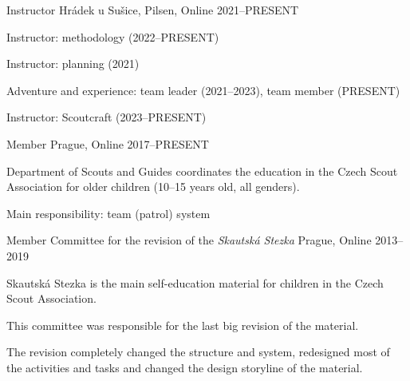 \begin{cventries}

  \cventry
    {Instructor} %
    {} %
    {Hrádek u Sušice, Pilsen, Online} %
    {2021--PRESENT} %
    {
      \begin{cvitems} %
        \item {Instructor: methodology  (2022--PRESENT)}
        \item {Instructor: planning (2021)}
        \item {Adventure and experience: team leader (2021--2023), team member (PRESENT)}
        \item {Instructor: Scoutcraft (2023--PRESENT)}
      \end{cvitems}
    }

    \cventry
      {Member} %
      {} %
      {Prague, Online} %
      {2017--PRESENT} %
      {
        \begin{cvitems} %
          \item {Department of Scouts and Guides coordinates the education in the Czech Scout Association for older children (10--15 years old, all genders).} 
          \item {Main responsibility: team (patrol) system}
        \end{cvitems}
      }

  \cventry
    {Member} %
    {Committee for the revision of the \emph{Skautská Stezka}} %
    {Prague, Online} %
    {2013--2019} %
    {
      \begin{cvitems} %
        \item {Skautská Stezka is the main self-education material for children in the Czech Scout Association.} 
        \item {This committee was responsible for the last big revision of the material.}
        \item {The revision completely changed the structure and system, redesigned most of the activities and tasks and changed the design storyline of the material.}
      \end{cvitems}
    }


\end{cventries}
